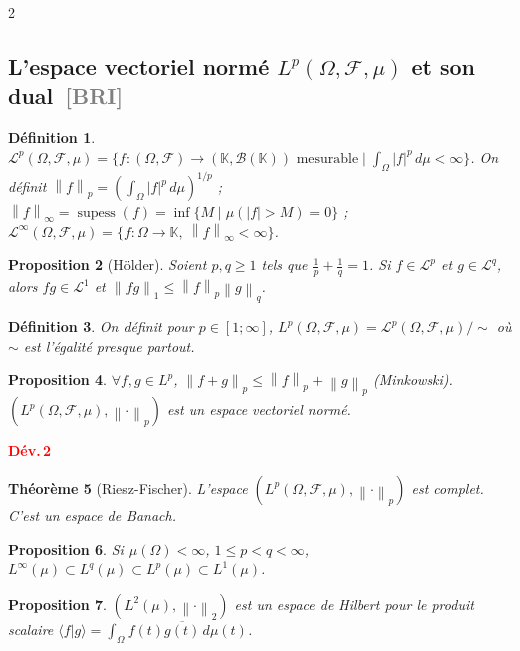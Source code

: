 \documentclass[10pt,a4paper]{article}
\theoremstyle{plan}
\newtheorem{theoreme}{Théorème}
\newtheorem{definition}[theoreme]{Définition}
\newtheorem{proposition}[theoreme]{Proposition}
\theoremstyle{planex}   %
\newcommand{\srcs}[1]{\ {\normalfont\small\textcolor{gray}{[#1]}}}
\newenvironment{devbloc}[1]{\par\smallskip\noindent\begin{lrbox}{\devsavebox}\begin{minipage}{\dimexpr\columnwidth-2\fboxsep-2\fboxrule}\vspace{-2pt}\hfill\textcolor{red}{\textbf{Dév.\,#1}}\par\vspace{-6pt}}{\end{minipage}\end{lrbox}{\color{red}\fbox{\color{black}\usebox{\devsavebox}}}\par\smallskip}
\newcommand{\K}{\mathbb{K}}
\newcommand{\Bb}{\mathcal{B}}
\newcommand{\Ll}{\mathcal{L}}
\newcommand{\norm}[1]{\left\lVert #1\right\rVert}
\newcommand{\abs}[1]{\left\lvert #1\right\rvert}
\begin{document}
\begin{multicols}{2}
\subsection{L'espace vectoriel normé $L^p(\Omega,\mathcal{F},\mu)$ et son dual\srcs{BRI}}

\begin{definition} %
$\Ll^p(\Omega,\mathcal{F},\mu) = \{ f : (\Omega,\mathcal{F}) \to (\K, \Bb(\K)) \text{ mesurable} \mid \int_\Omega \abs{f}^p\,d\mu < \infty \}$. On définit $\norm{f}_p = \left( \int_\Omega \abs{f}^p\,d\mu \right)^{1/p}$ ; $\norm{f}_\infty = \operatorname{supess}(f) = \inf \{ M \mid \mu(\abs{f} > M) = 0 \}$ ; $\Ll^\infty(\Omega,\mathcal{F},\mu) = \{ f : \Omega \to \K,\ \norm{f}_\infty < \infty \}$.
\end{definition}

\begin{proposition}[Hölder]
Soient $p, q \ge 1$ tels que $\frac{1}{p} + \frac{1}{q} = 1$. Si $f \in \Ll^p$ et $g \in \Ll^q$, alors $fg \in \Ll^1$ et $\norm{fg}_1 \le \norm{f}_p \norm{g}_q$.
\end{proposition}

\begin{definition}
On définit pour $p \in [1;\infty]$, $L^p(\Omega,\mathcal{F},\mu) = \Ll^p(\Omega,\mathcal{F},\mu) / \!\sim$ où $\sim$ est l'égalité presque partout.
\end{definition}

\begin{proposition}
$\forall f, g \in L^p$, $\norm{f+g}_p \le \norm{f}_p + \norm{g}_p$ (Minkowski). $(L^p(\Omega,\mathcal{F},\mu), \norm{\cdot}_p)$ est un espace vectoriel normé.
\end{proposition}

\begin{devbloc}{2}
\begin{theoreme}[Riesz-Fischer]
L'espace $(L^p(\Omega,\mathcal{F},\mu), \norm{\cdot}_p)$ est complet. C'est un espace de Banach.
\end{theoreme}
\end{devbloc}

\begin{proposition}
Si $\mu(\Omega) < \infty$, $1 \le p < q < \infty$, $L^\infty(\mu) \subset L^q(\mu) \subset L^p(\mu) \subset L^1(\mu)$.
\end{proposition}

\begin{proposition}
$(L^2(\mu), \norm{\cdot}_2)$ est un espace de Hilbert pour le produit scalaire $\langle f | g \rangle = \int_\Omega f(t) \overline{g(t)}\,d\mu(t)$.
\end{proposition}


\end{multicols}
\end{document}
